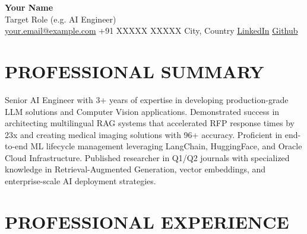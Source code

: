 \documentclass[11pt]{article}
\begin{document}
\begin{center}
\huge\textbf{Your Name}\\
\Large Target Role (e.g. AI Engineer)\\
\vspace{0.2em}
\normalsize
{} \href{mailto:your.email@example.com}{your.email@example.com} 
\hspace{0.5em}  +91 XXXXX XXXXX 
\hspace{0.5em}  City, Country 
\hspace{0.5em}  \href{https://linkedin.com}{LinkedIn} 
\hspace{0.5em}  \href{https://github.com}{Github}
\end{center}

\section{PROFESSIONAL SUMMARY}
Senior AI Engineer with 3+ years of expertise in developing production-grade LLM solutions and Computer Vision applications. Demonstrated success in architecting multilingual RAG systems that accelerated RFP response times by 23x and creating medical imaging solutions with 96+ accuracy. Proficient in end-to-end ML lifecycle management leveraging LangChain, HuggingFace, and Oracle Cloud Infrastructure. Published researcher in Q1/Q2 journals with specialized knowledge in Retrieval-Augmented Generation, vector embeddings, and enterprise-scale AI deployment strategies.

\section{PROFESSIONAL EXPERIENCE}
\end{document}
